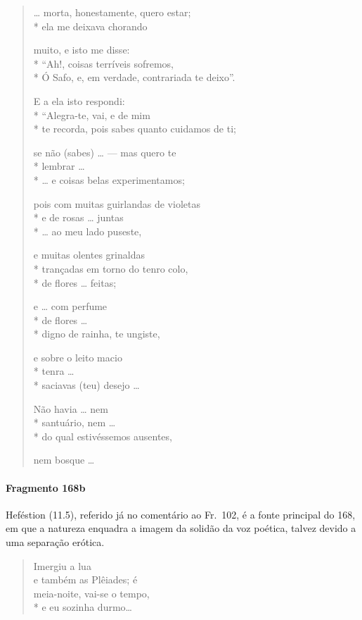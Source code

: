 \begin{verse}
\ldots{} morta, honestamente, quero estar;\\*
ela me deixava chorando

muito, e isto me disse:\\*
“Ah!, coisas terríveis sofremos,\\*
Ó Safo, e, em verdade, contrariada te deixo”.

E a ela isto respondi:\\*
“Alegra-te, vai, e de mim\\*
te recorda, pois sabes quanto cuidamos de ti;

se não (sabes) \ldots{} --- mas quero te\\*
lembrar \ldots{}\\*
\ldots{} e coisas belas experimentamos;

pois com muitas guirlandas de violetas\\*
e de rosas \ldots{} juntas\\*
\ldots{} ao meu lado puseste,			%

e muitas olentes grinaldas\\*
trançadas em torno do tenro colo, \\*
de flores \ldots{} feitas;

e \ldots{} com perfume\\*
de flores \ldots{}\\*
digno de rainha, te ungiste,

e sobre o leito macio\\*
tenra \ldots{}\\*
saciavas (teu) desejo \ldots{}

Não havia \ldots{} nem \\*
santuário, nem \ldots{}\\*
do qual estivéssemos ausentes,

nem bosque \ldots{}
\end{verse}


\paragraph{Fragmento 168b}

{\small Heféstion (11.5), referido já no comentário ao Fr.~102, é a fonte principal do 168, em que a natureza enquadra a imagem da solidão da voz poética, talvez devido
a uma separação erótica.}

\begin{verse}
Imergiu a lua\\
e também as Plêiades; é\\
meia-noite, vai-se o tempo,\\*
e eu sozinha durmo\ldots{}
\end{verse}

